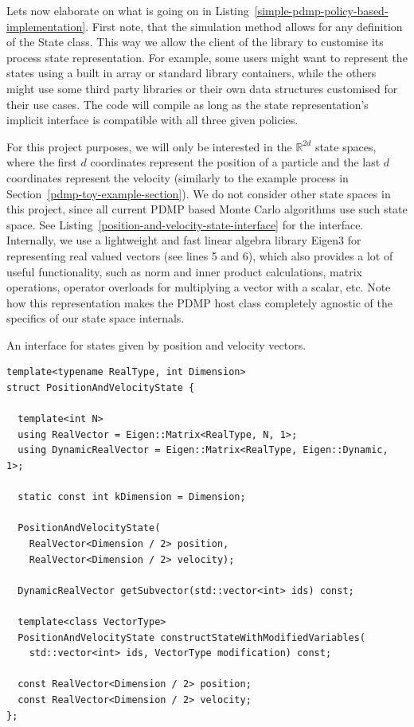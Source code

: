 \documentclass[report.tex]{subfiles}
\begin{document}
Lets now elaborate on what is going on in Listing~\ref{simple-pdmp-policy-based-implementation}.
First note, that the simulation method allows for any definition of the State class.
This way we allow the client of the library to customise its process state representation.
For example, some users might want to represent the states using a built in array or
standard library containers, while the others might use
some third party libraries or their own data structures customised for their use cases.
The code will compile as long as the state representation's implicit interface is
compatible with all three given policies.

For this project purposes, we will only be interested in the $\mathbb{R}^{2d}$ state
spaces, where the first $d$ coordinates represent the position of a particle
and the last $d$ coordinates represent the velocity (similarly to the example process in Section~\ref{pdmp-toy-example-section}).
We do not consider other state spaces in this project, since all current PDMP based
Monte Carlo algorithms use such state space.
See Listing~\ref{position-and-velocity-state-interface} for the interface.
Internally, we use a lightweight and fast linear algebra library Eigen3 \cite{eigenweb} for
representing real valued vectors (see lines 5 and 6), which also provides a lot of useful
functionality, such as norm and inner product calculations, matrix operations, operator overloads for multiplying
a vector with a scalar, etc.
Note how this representation makes the PDMP host class completely agnostic of the specifics
of our state space internals.

\begin{lstfloat}
\caption{An interface for states given by position and velocity vectors.}
\label{position-and-velocity-state-interface}
\begin{lstlisting}
template<typename RealType, int Dimension>
struct PositionAndVelocityState {

  template<int N>
  using RealVector = Eigen::Matrix<RealType, N, 1>;
  using DynamicRealVector = Eigen::Matrix<RealType, Eigen::Dynamic, 1>;

  static const int kDimension = Dimension;

  PositionAndVelocityState(
    RealVector<Dimension / 2> position,
    RealVector<Dimension / 2> velocity);

  DynamicRealVector getSubvector(std::vector<int> ids) const;

  template<class VectorType>
  PositionAndVelocityState constructStateWithModifiedVariables(
    std::vector<int> ids, VectorType modification) const;

  const RealVector<Dimension / 2> position;
  const RealVector<Dimension / 2> velocity;
};
\end{lstlisting}
\end{lstfloat}
\end{document}
